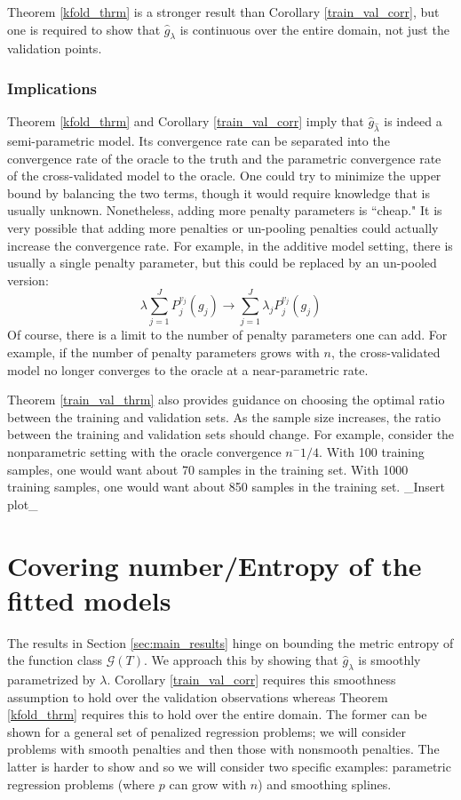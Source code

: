 \documentclass[12pt]{article}
\begin{document}
Theorem \ref{kfold_thrm} is a stronger result than Corollary \ref{train_val_corr}, but one is required to show that $\hat{g}_\lambda$ is continuous over the entire domain, not just the validation points.

\subsubsection{Implications}

Theorem \ref{kfold_thrm} and Corollary \ref{train_val_corr} imply that $\hat{g}_{\hat{\lambda}}$ is indeed a semi-parametric model. Its convergence rate can be separated into the convergence rate of the oracle to the truth and the parametric convergence rate of the cross-validated model to the oracle. One could try to minimize the upper bound by balancing the two terms, though it would require knowledge that is usually unknown. Nonetheless, adding more penalty parameters is ``cheap." It is very possible that adding more penalties or un-pooling penalties could actually increase the convergence rate. For example, in the additive model setting, there is usually a single penalty parameter, but this could be replaced by an un-pooled version:
\begin{equation}
\lambda \sum_{j=1}^J P_j^{v_j}(g_j) \rightarrow  \sum_{j=1}^J \lambda_j P_j^{v_j}(g_j)
\end{equation}
Of course, there is a limit to the number of penalty parameters one can add. For example, if the number of penalty parameters grows with $n$, the cross-validated model no longer converges to the oracle at a near-parametric rate.

Theorem \ref{train_val_thrm} also provides guidance on choosing the optimal ratio between the training and validation sets. As the sample size increases, the ratio between the training and validation sets should change. For example, consider the nonparametric setting with the oracle convergence $n^-1/4$. With 100 training samples, one would want about 70 samples in the training set. With 1000 training samples, one would want about 850 samples in the training set. \_Insert plot\_

\section{Covering number/Entropy of the fitted models}\label{sec:entropy}

The results in Section \ref{sec:main_results} hinge on bounding the metric entropy of the function class $\mathcal{G}(T)$. We approach this by showing that $\hat{g}_\lambda$ is smoothly parametrized by $\lambda$. 
Corollary \ref{train_val_corr} requires this smoothness assumption to hold over the validation observations whereas Theorem \ref{kfold_thrm} requires this to hold over the entire domain. The former can be shown for a general set of penalized regression problems; we will consider problems with smooth penalties and then those with nonsmooth penalties. The latter is harder to show and so we will consider two specific examples: parametric regression problems (where $p$ can grow with $n$) and smoothing splines.
\end{document}

